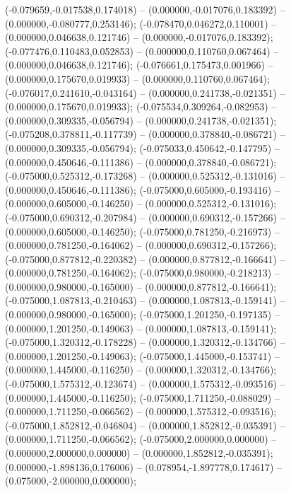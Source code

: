 (-0.079659,-0.017538,0.174018) -- (0.000000,-0.017076,0.183392) -- (0.000000,-0.080777,0.253146);
 (-0.078470,0.046272,0.110001) -- (0.000000,0.046638,0.121746) -- (0.000000,-0.017076,0.183392);
 (-0.077476,0.110483,0.052853) -- (0.000000,0.110760,0.067464) -- (0.000000,0.046638,0.121746);
 (-0.076661,0.175473,0.001966) -- (0.000000,0.175670,0.019933) -- (0.000000,0.110760,0.067464);
 (-0.076017,0.241610,-0.043164) -- (0.000000,0.241738,-0.021351) -- (0.000000,0.175670,0.019933);
 (-0.075534,0.309264,-0.082953) -- (0.000000,0.309335,-0.056794) -- (0.000000,0.241738,-0.021351);
 (-0.075208,0.378811,-0.117739) -- (0.000000,0.378840,-0.086721) -- (0.000000,0.309335,-0.056794);
 (-0.075033,0.450642,-0.147795) -- (0.000000,0.450646,-0.111386) -- (0.000000,0.378840,-0.086721);
 (-0.075000,0.525312,-0.173268) -- (0.000000,0.525312,-0.131016) -- (0.000000,0.450646,-0.111386);
 (-0.075000,0.605000,-0.193416) -- (0.000000,0.605000,-0.146250) -- (0.000000,0.525312,-0.131016);
 (-0.075000,0.690312,-0.207984) -- (0.000000,0.690312,-0.157266) -- (0.000000,0.605000,-0.146250);
 (-0.075000,0.781250,-0.216973) -- (0.000000,0.781250,-0.164062) -- (0.000000,0.690312,-0.157266);
 (-0.075000,0.877812,-0.220382) -- (0.000000,0.877812,-0.166641) -- (0.000000,0.781250,-0.164062);
 (-0.075000,0.980000,-0.218213) -- (0.000000,0.980000,-0.165000) -- (0.000000,0.877812,-0.166641);
 (-0.075000,1.087813,-0.210463) -- (0.000000,1.087813,-0.159141) -- (0.000000,0.980000,-0.165000);
 (-0.075000,1.201250,-0.197135) -- (0.000000,1.201250,-0.149063) -- (0.000000,1.087813,-0.159141);
 (-0.075000,1.320312,-0.178228) -- (0.000000,1.320312,-0.134766) -- (0.000000,1.201250,-0.149063);
 (-0.075000,1.445000,-0.153741) -- (0.000000,1.445000,-0.116250) -- (0.000000,1.320312,-0.134766);
 (-0.075000,1.575312,-0.123674) -- (0.000000,1.575312,-0.093516) -- (0.000000,1.445000,-0.116250);
 (-0.075000,1.711250,-0.088029) -- (0.000000,1.711250,-0.066562) -- (0.000000,1.575312,-0.093516);
 (-0.075000,1.852812,-0.046804) -- (0.000000,1.852812,-0.035391) -- (0.000000,1.711250,-0.066562);
 (-0.075000,2.000000,0.000000) -- (0.000000,2.000000,0.000000) -- (0.000000,1.852812,-0.035391);
 (0.000000,-1.898136,0.176006) -- (0.078954,-1.897778,0.174617) -- (0.075000,-2.000000,0.000000);
